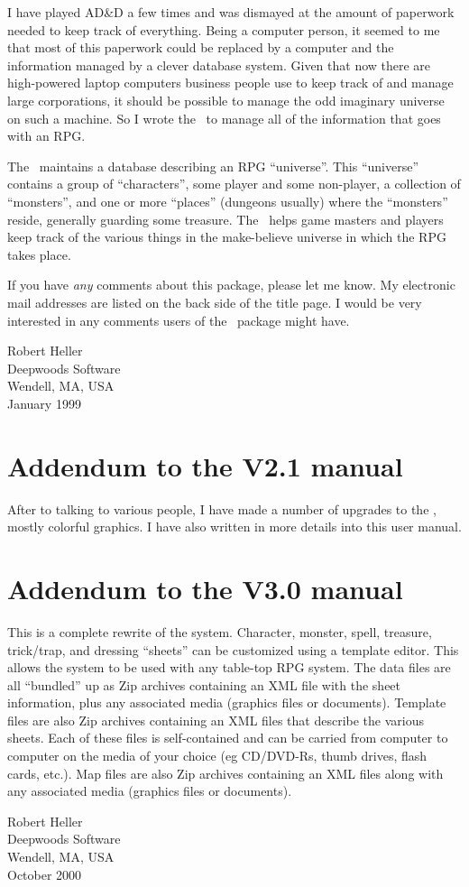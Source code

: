 I have played AD\&D a few times and was dismayed at the amount of paperwork needed to keep track of everything.  Being a computer person, it
seemed to me that most of this paperwork could be replaced by a
computer and the information managed by a clever database system.  Given
that now there are high-powered laptop computers business people use
to keep track of and manage large corporations, it should be possible to
manage the odd imaginary universe on such a machine.  So I wrote
the \thesystem\ to manage all of the information that goes with an RPG.

The \thesystem\ maintains a database describing an RPG ``universe''.  
This ``universe'' contains a group of ``characters'', some player and
some non-player, a collection of ``monsters'', and one or more
``places'' (dungeons usually) where the ``monsters'' reside, generally
guarding some treasure.  The \thesystem\ helps game masters and players
keep track of the various things in the make-believe universe in
which the RPG takes place.

If you have {\em any} comments about this package, please let me know.
My electronic mail addresses are listed on the back side of the title
page.  I would be very interested in any comments users of the
\thesystem\ package might have.

\vspace{.25in}
\noindent
Robert Heller \\
Deepwoods Software \\
Wendell, MA, USA \\
January 1999

\section*{Addendum to the V2.1 manual}
%

After to talking to various people, I have made a number of upgrades to
the \thesystem, mostly colorful graphics.  I have also written in more
details into this user manual.

\section*{Addendum to the V3.0 manual}
%

This is a complete rewrite of the system.  Character, monster, spell, treasure,
trick/trap, and dressing ``sheets'' can be customized using a template
editor.  This allows the system to be used with any table-top RPG
system.  The data files are all ``bundled'' up as Zip archives
containing an XML file with the sheet information, plus any associated
media (graphics files or documents).  Template files are also Zip
archives containing an XML files that describe the various sheets.  Each
of these files is self-contained and can be carried from computer to
computer on the media of your choice (eg CD/DVD-Rs, thumb drives, flash
cards, etc.).  Map files are also Zip archives containing an XML files
along with any associated media (graphics files or documents).

\vspace{.25in}
\noindent
Robert Heller \\
Deepwoods Software \\
Wendell, MA, USA \\
October 2000
